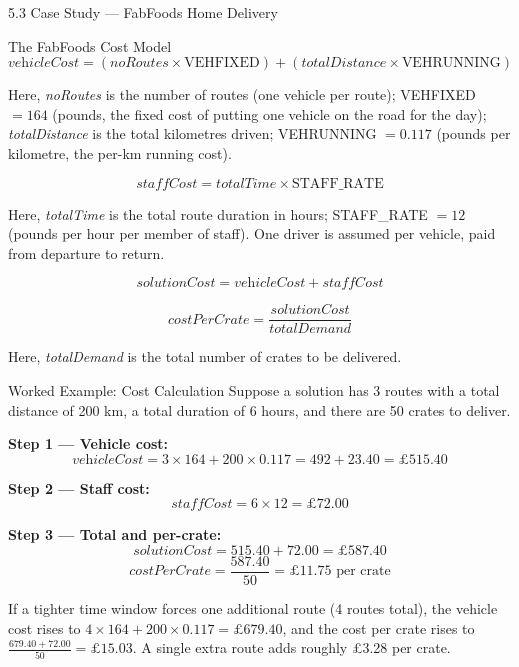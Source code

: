 \documentclass[aspectratio=169,10pt]{beamer}
\begin{document}
\begin{frame}[allowframebreaks]{5.3 Case Study — FabFoods Home Delivery}
\begin{block}{The FabFoods Cost Model}
    \[
      \textit{vehicleCost} = (\textit{noRoutes} \times \text{VEHFIXED})
        + (\textit{totalDistance} \times \text{VEHRUNNING})
    \]

    Here, \textit{noRoutes} is the number of routes (one vehicle per route);
    VEHFIXED $= 164$ (pounds, the fixed cost of putting one vehicle on the
    road for the day); \textit{totalDistance} is the total kilometres driven;
    VEHRUNNING $= 0.117$ (pounds per kilometre, the per-km running cost).

    \[
      \textit{staffCost} = \textit{totalTime} \times \text{STAFF\_RATE}
    \]

    Here, \textit{totalTime} is the total route duration in hours;
    STAFF\_RATE $= 12$ (pounds per hour per member of staff).  One driver
    is assumed per vehicle, paid from departure to return.

    \[
      \textit{solutionCost} = \textit{vehicleCost} + \textit{staffCost}
    \]

    \[
      \textit{costPerCrate} = \frac{\textit{solutionCost}}{\textit{totalDemand}}
    \]

    Here, \textit{totalDemand} is the total number of crates to be delivered.
  \end{block}

\framebreak

  \begin{exampleblock}{Worked Example: Cost Calculation}
    Suppose a solution has 3 routes with a total distance of 200 km, a total
    duration of 6 hours, and there are 50 crates to deliver.

    \smallskip
    \textbf{Step 1 — Vehicle cost:}
    \[
      \textit{vehicleCost} = 3 \times 164 + 200 \times 0.117
                           = 492 + 23.40 = \pounds 515.40
    \]

    \textbf{Step 2 — Staff cost:}
    \[
      \textit{staffCost} = 6 \times 12 = \pounds 72.00
    \]

    \textbf{Step 3 — Total and per-crate:}
    \[
      \textit{solutionCost} = 515.40 + 72.00 = \pounds 587.40
    \]
    \[
      \textit{costPerCrate} = \frac{587.40}{50} = \pounds 11.75 \text{ per crate}
    \]

    If a tighter time window forces one additional route (4 routes total),
    the vehicle cost rises to $4 \times 164 + 200 \times 0.117 = \pounds 679.40$,
    and the cost per crate rises to $\frac{679.40 + 72.00}{50} = \pounds 15.03$.
    A single extra route adds roughly \pounds 3.28 per crate.
  \end{exampleblock}


\end{frame}
\end{document}
